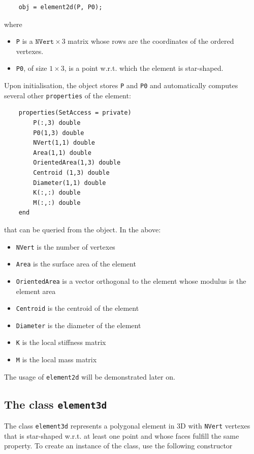 \documentclass[a4paper]{article}
\begin{document}
\begin{lstlisting}
	obj = element2d(P, P0);
\end{lstlisting}
%
where
\begin{itemize}
\item \texttt{P} is a $\texttt{NVert} \times 3$ matrix whose rows are the coordinates of the ordered vertexes. 
\item \texttt{P0}, of size $1\times 3$, is a point w.r.t. which the element is star-shaped.
\end{itemize}

\noindent
Upon initialisation, the object stores \texttt{P} and \texttt{P0} and automatically computes several other \texttt{properties} of the element:

\begin{lstlisting}
	properties(SetAccess = private)
		P(:,3) double
		P0(1,3) double 
		NVert(1,1) double
		Area(1,1) double 
		OrientedArea(1,3) double
		Centroid (1,3) double
		Diameter(1,1) double
		K(:,:) double
		M(:,:) double
	end
\end{lstlisting}

\noindent
that can be queried from the object. In the above:
\begin{itemize}
\item \texttt{NVert} is the number of vertexes
\item \texttt{Area} is the surface area of the element
\item \texttt{OrientedArea} is a vector orthogonal to the element whose modulus is the element area
\item \texttt{Centroid} is the centroid of the element
\item \texttt{Diameter} is the diameter of the element
\item \texttt{K} is the local stiffness matrix
\item \texttt{M} is the local mass matrix
\end{itemize}

\noindent
The usage of \texttt{element2d} will be demonstrated later on.

\subsection{The class \texttt{element3d}}
The class \texttt{element3d} represents a polygonal element in 3D with \texttt{NVert} vertexes that is star-shaped w.r.t. at least one point and whose faces fulfill the same property.  To create an instance of the class, use the following constructor
\end{document}

